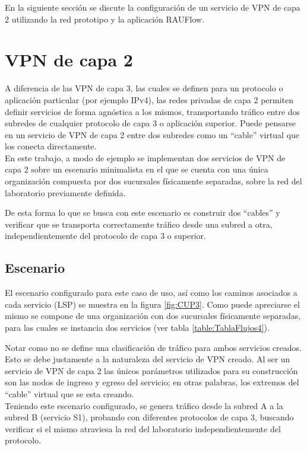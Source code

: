 En la siguiente secci\'on se discute la configuraci\'on de un servicio de VPN de capa 2 utilizando la red prototipo y la aplicaci\'on RAUFlow.

\section{VPN de capa 2}

A diferencia de las VPN de capa 3, las cuales se definen para un protocolo o aplicaci\'on particular  
 (por ejemplo IPv4), las redes privadas de capa 2 permiten definir servicios de forma agnóstica a los mismos, transportando tr\'afico entre dos subredes de cualquier protocolo de capa 3 o aplicación superior. Puede pensarse en un servicio de VPN de capa 2 entre dos subredes como un “cable” virtual que los conecta directamente.\\

En este trabajo, a modo de ejemplo se implementan dos servicios de VPN de capa 2 sobre un escenario minimalista en el que se cuenta con una \'unica organización compuesta por dos sucursales físicamente separadas, sobre la red del laboratorio previamente definida.

De esta forma lo que se busca con este escenario es construir dos “cables” y verificar que se transporta correctamente tr\'afico desde una subred a otra, independientemente del protocolo de capa 3 o superior.

\subsection{Escenario}
El escenario configurado para este caso de uso, as\'i como los caminos asociados a cada servicio (LSP) se muestra en la figura \ref{fig:CUP3}. Como puede apreciarse el mismo se compone de una organización con dos sucursales físicamente separadas, para las cuales se instancia dos servicios (ver tabla \ref{table:TablaFlujos4}). 

Notar como no se define una clasificaci\'on de tr\'afico para ambos servicios creados. Esto se debe justamente a la naturaleza del servicio de VPN creado. Al ser un servicio de VPN de capa 2 las \'unicos par\'ametros utilizados para su construcci\'on son las nodos de ingreso y egreso del servicio; en otras palabras, los extremos del “cable” virtual que se esta creando.\\

Teniendo este escenario configurado, se genera tr\'afico desde la subred A a la subred B (servicio S1), probando con diferentes protocolos de capa 3, buscando verificar si el mismo atraviesa la red del laboratorio independientemente del protocolo. \\

